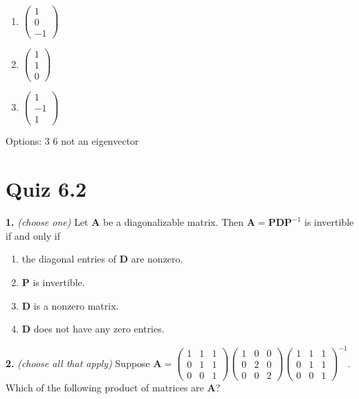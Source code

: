 \documentclass[10pt,a4paper]{article}
\begin{document}
\begin{enumerate}[label=(\alph*)]
\item \(\begin{pmatrix}1\\0\\-1 \end{pmatrix}\)
\item \(\begin{pmatrix}1\\1\\0 \end{pmatrix}\)
\item \(\begin{pmatrix}1\\-1\\1 \end{pmatrix}\)
\end{enumerate}
\quad Options: 3 \textbar{} 6 \textbar{} not an eigenvector

\smallskip
\section{Quiz 6.2}
\textbf{1.} \textit{(choose one)} Let \(\mathbf{A}\) be a diagonalizable matrix. Then \(\mathbf{A=PDP}^{-1}\) is invertible if and only if

\begin{enumerate}[label=(\Alph*)]
\item the diagonal entries of \(\mathbf{D}\) are nonzero.
\item \(\mathbf{P}\) is invertible.
\item \(\mathbf{D}\) is a nonzero matrix.
\item \(\mathbf{D}\) does not have any zero entries.
\end{enumerate}
\smallskip
\textbf{2.} \textit{(choose all that apply)} Suppose \(\mathbf{A}=\begin{pmatrix}1&1&1\\0&1&1\\0&0&1\end{pmatrix}\begin{pmatrix}1&0&0\\0&2&0\\0&0&2\end{pmatrix}\begin{pmatrix}1&1&1\\0&1&1\\0&0&1\end{pmatrix}^{-1}\). Which of the following product of matrices are \(\mathbf{A}\)?
\end{document}
